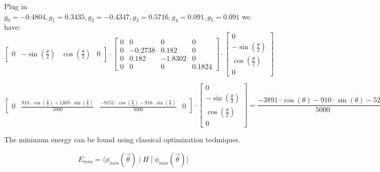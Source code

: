 \documentclass{article}
\begin{document}
\begin{itemize}
	      Plug in  \(g_0 = -0.4804, g_1 = 0.3435, g_2 = -0.4347, g_3 = 0.5716, g_4 = 0.091, g_5 = 0.091\) we have:
	      \[
		      \begin{bmatrix}
			      0 & -\sin(\frac{\theta}{2}) & \cos(\frac{\theta}{2}) & 0
		      \end{bmatrix}
		      \cdot
		      \begin{bmatrix}
			      0 & 0       & 0       & 0      \\
			      0 & -0.2738 & 0.182   & 0      \\
			      0 & 0.182   & -1.8302 & 0      \\
			      0 & 0       & 0       & 0.1824
		      \end{bmatrix}
		      \cdot
		      \begin{bmatrix}
			      0                        \\
			      - \sin(\frac{\theta}{2}) \\
			      \cos(\frac{\theta}{2})   \\
			      0
		      \end{bmatrix}
	      \]

	      \[
		      \begin{bmatrix}
			      0 & \frac{910 \cdot \cos\left(\frac{\theta}{2}\right)+1369 \cdot \sin\left(\frac{\theta}{2}\right)}{5000} & \frac{-9151 \cdot \cos\left(\frac{\theta}{2}\right)-910 \cdot \sin\left(\frac{\theta}{2}\right)}{5000} & 0
		      \end{bmatrix}
		      \cdot
		      \begin{bmatrix}
			      0                        \\
			      - \sin(\frac{\theta}{2}) \\
			      \cos(\frac{\theta}{2})   \\
			      0
		      \end{bmatrix}
		      =  \frac{-3891 \cdot \cos\left(\theta\right)-910 \cdot \sin\left(\theta\right)-5260}{5000}
	      \]

	      The minimum energy can be found using classical optimization techniques.

	      \[E_{min} = \langle \phi_{min}(\vec{\theta}) \mid H \mid \phi_{min}(\vec{\theta}) \rangle\]
\end{itemize}
\end{document}
